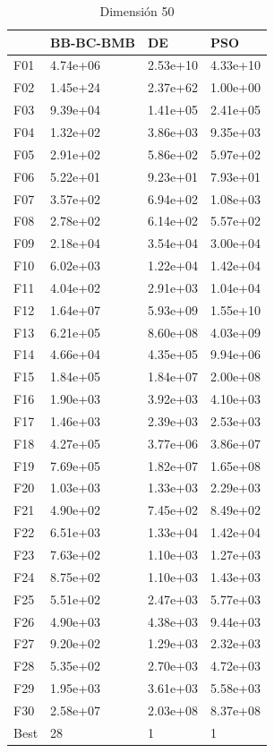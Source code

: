 \begin{table}[H]
    \begin{minipage}{.5\linewidth}
      \caption{Dimensión 50}
      \centering
      \begin{tabular}{llll}
        \toprule
        {} & BB-BC-BMB &        DE &       PSO \\
        \midrule
        F01  &  4.74e+06 &  2.53e+10 &  4.33e+10 \\
        F02  &  1.45e+24 &  2.37e+62 &  1.00e+00 \\
        F03  &  9.39e+04 &  1.41e+05 &  2.41e+05 \\
        F04  &  1.32e+02 &  3.86e+03 &  9.35e+03 \\
        F05  &  2.91e+02 &  5.86e+02 &  5.97e+02 \\
        F06  &  5.22e+01 &  9.23e+01 &  7.93e+01 \\
        F07  &  3.57e+02 &  6.94e+02 &  1.08e+03 \\
        F08  &  2.78e+02 &  6.14e+02 &  5.57e+02 \\
        F09  &  2.18e+04 &  3.54e+04 &  3.00e+04 \\
        F10  &  6.02e+03 &  1.22e+04 &  1.42e+04 \\
        F11  &  4.04e+02 &  2.91e+03 &  1.04e+04 \\
        F12  &  1.64e+07 &  5.93e+09 &  1.55e+10 \\
        F13  &  6.21e+05 &  8.60e+08 &  4.03e+09 \\
        F14  &  4.66e+04 &  4.35e+05 &  9.94e+06 \\
        F15  &  1.84e+05 &  1.84e+07 &  2.00e+08 \\
        F16  &  1.90e+03 &  3.92e+03 &  4.10e+03 \\
        F17  &  1.46e+03 &  2.39e+03 &  2.53e+03 \\
        F18  &  4.27e+05 &  3.77e+06 &  3.86e+07 \\
        F19  &  7.69e+05 &  1.82e+07 &  1.65e+08 \\
        F20  &  1.03e+03 &  1.33e+03 &  2.29e+03 \\
        F21  &  4.90e+02 &  7.45e+02 &  8.49e+02 \\
        F22  &  6.51e+03 &  1.33e+04 &  1.42e+04 \\
        F23  &  7.63e+02 &  1.10e+03 &  1.27e+03 \\
        F24  &  8.75e+02 &  1.10e+03 &  1.43e+03 \\
        F25  &  5.51e+02 &  2.47e+03 &  5.77e+03 \\
        F26  &  4.90e+03 &  4.38e+03 &  9.44e+03 \\
        F27  &  9.20e+02 &  1.29e+03 &  2.32e+03 \\
        F28  &  5.35e+02 &  2.70e+03 &  4.72e+03 \\
        F29  &  1.95e+03 &  3.61e+03 &  5.58e+03 \\
        F30  &  2.58e+07 &  2.03e+08 &  8.37e+08 \\
        Best &        28 &         1 &         1 \\
        \bottomrule
        \end{tabular}
        

\end{minipage}
\end{table}
